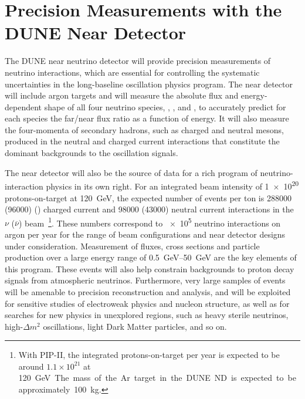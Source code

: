 %
%
\section{Precision Measurements with the DUNE Near Detector}

The DUNE near neutrino detector
will provide precision measurements of
neutrino interactions, which are essential
for controlling the systematic uncertainties in the long-baseline
oscillation physics program.  The near detector %
will include argon targets and will measure the absolute flux and energy-dependent
shape of all four neutrino species, \numu, \anumu, \nue and \anue,
to accurately predict for each species the
far/near flux ratio as a function of energy.  It will also measure the
four-momenta of secondary hadrons, such as charged and neutral mesons,
produced in the neutral and charged current interactions that
constitute the dominant backgrounds to the oscillation signals.

The near detector will also be the source of data for a rich program
of neutrino-interaction physics in its own right. For an integrated
beam intensity of \num{1e20} %
protons-on-target at \SI{120}{GeV}, the expected number of events per
ton is \num{288000} (\num{96000}) %
\numu (\anumu) charged current and \num{98000} (\num{43000}) neutral
current interactions in the $\nu$ ($\overline\nu$) beam~\footnote{With PIP-II, the integrated protons-on-target per year is
  expected to be around $1.1\times 10^{21}$ at \SI{120}\GeV. The mass
  of the Ar target in the DUNE ND is expected to be approximately
  100~kg.}. These numbers correspond to \num{e5} neutrino interactions
on argon per year for the range of beam configurations and near detector
designs under consideration.  Measurement of fluxes, cross sections
and particle production over a large energy range of
\SIrange{0.5}{50}{\GeV} are the key elements of this program.  These
events will also help constrain backgrounds to proton decay signals
from atmospheric neutrinos.  Furthermore, very large samples of events
will be amenable to precision reconstruction and analysis, and will be
exploited for sensitive studies of electroweak physics and nucleon
structure, as well as for searches for new physics in unexplored
regions, such as heavy sterile neutrinos, high-$\Delta m^2$
oscillations, light Dark Matter particles, and so on.

